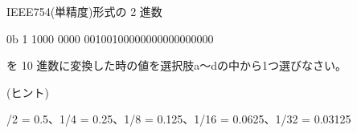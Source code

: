 IEEE754(単精度)形式の 2 進数

\vspace{1em}
\begin{center}
0b 1 1000 0000 00100100000000000000000
\end{center}

\vspace{1em}
\noindent を 10 進数に変換した時の値を選択肢a〜dの中から1つ選びなさい。

\vspace{1em}
\noindent (ヒント)

/2 = 0.5、1/4 = 0.25、1/8 = 0.125、1/16 = 0.0625、1/32 = 0.03125
